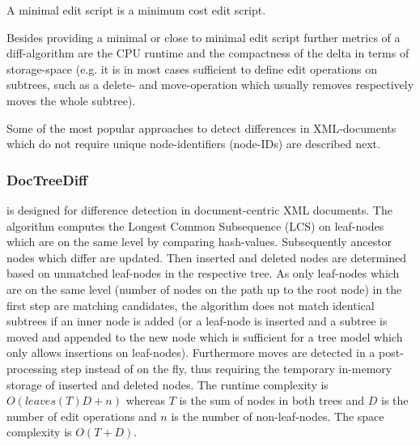 \begin{mydef}
A minimal edit script is a minimum cost edit script.
\end{mydef}

Besides providing a minimal or close to minimal edit script further metrics of a diff-algorithm are the CPU runtime and the compactness of the delta in terms of storage-space (e.g. it is in most cases sufficient to define edit operations on subtrees, such as a delete- and move-operation which usually removes respectively moves the whole subtree).

Some of the most popular approaches to detect differences in XML-documents which do not require unique node-identifiers (node-IDs) are described next.

\subsubsection{DocTreeDiff\cite{ronnau2009efficient}}
is designed for difference detection in document-centric XML documents. The algorithm computes the Longest Common Subsequence (LCS) on leaf-nodes which are on the same level by comparing hash-values. Subsequently ancestor nodes which differ are updated. Then inserted and deleted nodes are determined based on unmatched leaf-nodes in the respective tree. As only leaf-nodes which are on the same level (number of nodes on the path up to the root node) in the first step are matching candidates, the algorithm does not match identical subtrees if an inner node is added (or a leaf-node is inserted and a subtree is moved and appended to the new node which is sufficient for a tree model which only allows insertions on leaf-nodes). Furthermore moves are detected in a post-processing step instead of on the fly, thus requiring the temporary in-memory storage of inserted and deleted nodes. The runtime complexity is $O(leaves(T)D + n)$ whereas $T$ is the sum of nodes in both trees and $D$ is the number of edit operations and $n$ is the number of non-leaf-nodes. The space complexity is $O(T+D)$.%


